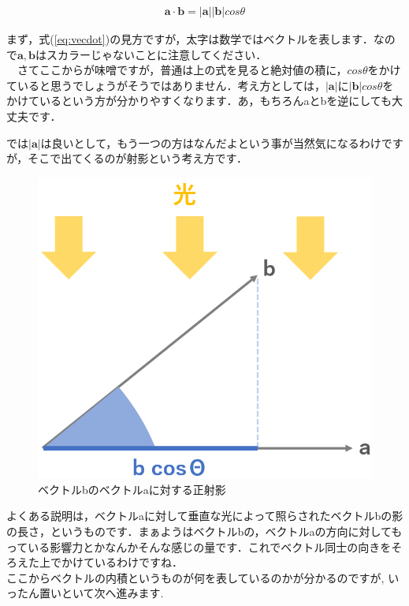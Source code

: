 \documentclass[11pt,a4paper,uplatex]{ujreport}
\begin{document}
\begin{eqnarray}
\label{eq:vecdot}
\mathbf{a}\cdot \mathbf{b} = |\mathbf{a}||\mathbf{b}|cos\theta
\end{eqnarray}

まず，式(\ref{eq:vecdot})の見方ですが，太字は数学ではベクトルを表します．なので$\mathbf{a, b}$はスカラーじゃないことに注意してください．\\
　さてここからが味噌ですが，普通は上の式を見ると絶対値の積に，$cos\theta$をかけていると思うでしょうがそうではありません．考え方としては，$|\mathbf{a}|$に$|\mathbf{b}|cos\theta$をかけているという方が分かりやすくなります．あ，もちろんaとbを逆にしても大丈夫です．

では$|\mathbf{a}|$は良いとして，もう一つの方はなんだよという事が当然気になるわけですが，そこで出てくるのが射影という考え方です．

\begin{figure}[H]
\label{im:shadow}
  \centering
  \includegraphics[width=120mm,bb=0 0 687 618]{../figures/shadow.png}
  \caption{ベクトルbのベクトルaに対する正射影}
\end{figure}

よくある説明は，ベクトルaに対して垂直な光によって照らされたベクトルbの影の長さ，というものです．まぁようはベクトルbの，ベクトルaの方向に対してもっている影響力とかなんかそんな感じの量です．これでベクトル同士の向きをそろえた上でかけているわけですね．\\

ここからベクトルの内積というものが何を表しているのかが分かるのですが, いったん置いといて次へ進みます.\\
\end{document}
